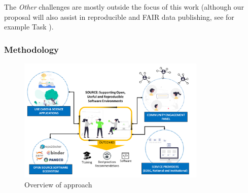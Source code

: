 The \emph{Other} challenges are mostly outside the focus of this work
(although our proposal will also assist in reproducible and FAIR data
publishing, see for example Task ).





\subsubsection{Methodology}\label{sec:methodology}

\begin{figure}[htb]
  \centerline{
    \includegraphics[width=0.80\textwidth]{images/approach.png}
    }
  \caption{Overview of \TheProject approach} \label{fig:overview-approach}
\end{figure}

